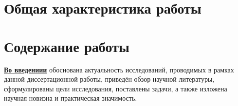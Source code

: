 
\setcounter{page}{1}

\section*{Общая характеристика работы}

\newcommand{\actuality}{\pdfbookmark[1]{Актуальность}{actuality}\underline{\textbf{\actualityTXT}}}
\newcommand{\progress}{\pdfbookmark[1]{Разработанность темы}{progress}\underline{\textbf{\progressTXT}}}
\newcommand{\aim}{\pdfbookmark[1]{Цели}{aim}\underline{{\textbf\aimTXT}}}
\newcommand{\tasks}{\pdfbookmark[1]{Задачи}{tasks}\underline{\textbf{\tasksTXT}}}
\newcommand{\aimtasks}{\pdfbookmark[1]{Цели и задачи}{aimtasks}\aimtasksTXT}
\newcommand{\novelty}{\pdfbookmark[1]{Научная новизна}{novelty}\underline{\textbf{\noveltyTXT}}}
\newcommand{\influence}{\pdfbookmark[1]{Практическая значимость}{influence}\underline{\textbf{\influenceTXT}}}
\newcommand{\methods}{\pdfbookmark[1]{Методология и методы исследования}{methods}\underline{\textbf{\methodsTXT}}}
\newcommand{\defpositions}{\pdfbookmark[1]{Положения, выносимые на защиту}{defpositions}\underline{\textbf{\defpositionsTXT}}}
\newcommand{\reliability}{\pdfbookmark[1]{Достоверность}{reliability}\underline{\textbf{\reliabilityTXT}}}
\newcommand{\probation}{\pdfbookmark[1]{Апробация}{probation}\underline{\textbf{\probationTXT}}}
\newcommand{\contribution}{\pdfbookmark[1]{Личный вклад}{contribution}\underline{\textbf{\contributionTXT}}}
\newcommand{\publications}{\pdfbookmark[1]{Публикации}{publications}\underline{\textbf{\publicationsTXT}}}




\section*{Содержание работы}
\underline{\textbf{Во введениии}} обоснована актуальность исследований, проводимых в рамках данной диссертационной работы, приведён обзор научной литературы, сформулированы цели исследования, поставлены задачи, а также изложена научная новизна и практическая значимость.

